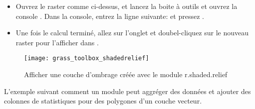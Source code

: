 \begin{itemize}[label=--]
\item Ouvrez le raster  comme ci-dessus, et lancez la boite à outils \grass et ouvrez la console \grass. Dans la console, entrez la ligne suivante:\linebreak {} \linebreak et pressez .

\item Une fois le calcul terminé, allez sur l'onglet  et doubel-cliquez sur le nouveau raster  pour l'afficher dans \qg.
\end{itemize}

\begin{figure}[p]
 \begin{center}

 \texttt{[image: grass\_toolbox\_shadedrelief]}
  \caption{Afficher une couche d'ombrage créée avec le module \grass r.shaded.relief \nixcaption}\label{fig:grass_toolbox_shadedrelief}
 \end{center}
\end{figure}


L'exemple suivant comment un module \grass peut aggréger des données et ajouter des colonnes de statistiques pour des polygones d'un couche vecteur.

